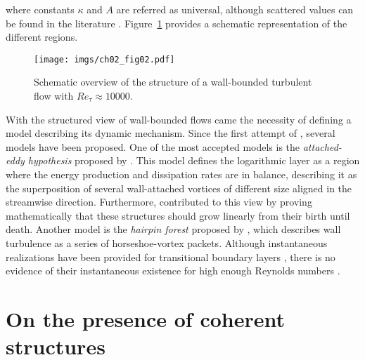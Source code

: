 \noindent where constants $\kappa$ and $A$ are referred as universal, although scattered values can be found in the literature \citep{george2007there,marusic2010wall,bailey2014estimating}.
Figure~\ref{ch02:fig02} provides a schematic representation of the different regions.
\begin{figure}
  \centering
  \texttt{[image: imgs/ch02\_fig02.pdf]}
  \caption{\label{ch02:fig02}Schematic overview of the structure of a wall-bounded turbulent flow with $Re_{\tau}\approx10000$.}
\end{figure}

With the structured view of wall-bounded flows came the necessity of defining a model describing its dynamic mechanism.
Since the first attempt of \citet{theodorsen1952mechanisms}, several models have been proposed.
One of the most accepted models is the \textit{attached-eddy hypothesis} proposed by \citet{townsend1976structure}.
This model defines the logarithmic layer as a region where the energy production and dissipation rates are in balance, describing it as the superposition of several wall-attached vortices of different size aligned in the streamwise direction.
Furthermore, \citet{perry1982mechanism} contributed to this view by proving mathematically that these structures should grow linearly from their birth until death.
Another model is the \textit{hairpin forest} proposed by \citet{adrian2000vortex}, which describes wall turbulence as a series of horseshoe-vortex packets.
Although instantaneous realizations have been provided for transitional boundary layers \citep{wu2010transitional}, there is no evidence of their instantaneous existence for high enough Reynolds numbers \citep{schlatter2010assessment,sillero2013one}.

\section{On the presence of coherent structures}\label{ch02:s2}

